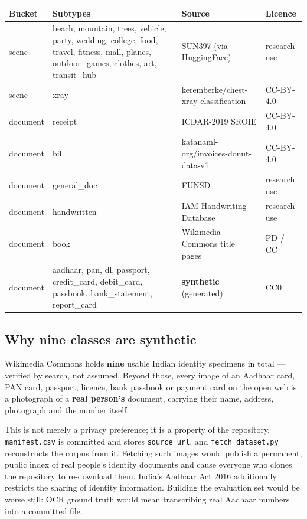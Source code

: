 \documentclass[11pt,a4paper]{article}
\newcommand{\code}[1]{\texttt{\small #1}}
\begin{document}
\begin{longtable}{@{}p{1.8cm}p{6.6cm}p{4.4cm}p{2.6cm}@{}}
\toprule
\textbf{Bucket} & \textbf{Subtypes} & \textbf{Source} & \textbf{Licence} \\
\midrule
\endhead
scene & beach, mountain, trees, vehicle, party, wedding, college, food, travel,
        fitness, mall, planes, outdoor\_games, clothes, art, transit\_hub
      & SUN397 (via HuggingFace) & research use \\
scene & xray & keremberke/chest-xray-classification & CC-BY-4.0 \\
document & receipt & ICDAR-2019 SROIE & CC-BY-4.0 \\
document & bill & katanaml-org/invoices-donut-data-v1 & CC-BY-4.0 \\
document & general\_doc & FUNSD & research use \\
document & handwritten & IAM Handwriting Database & research use \\
document & book & Wikimedia Commons title pages & PD / CC \\
document & aadhaar, pan, dl, passport, credit\_card, debit\_card, passbook,
           bank\_statement, report\_card
         & \textbf{synthetic} (generated) & CC0 \\
\bottomrule
\end{longtable}

\subsection{Why nine classes are synthetic}

Wikimedia Commons holds \textbf{nine} usable Indian identity specimens in total
--- verified by search, not assumed. Beyond those, every image of an Aadhaar
card, PAN card, passport, licence, bank passbook or payment card on the open web
is a photograph of a \textbf{real person's} document, carrying their name,
address, photograph and the number itself.

This is not merely a privacy preference; it is a property of the repository.
\code{manifest.csv} is committed and stores \code{source\_url}, and
\code{fetch\_dataset.py} reconstructs the corpus from it. Fetching such images
would publish a permanent, public index of real people's identity documents and
cause everyone who clones the repository to re-download them. India's Aadhaar
Act 2016 additionally restricts the sharing of identity information. Building the
evaluation set would be worse still: OCR ground truth would mean transcribing
real Aadhaar numbers into a committed file.
\end{document}
